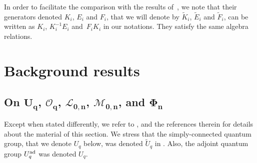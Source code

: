 \documentclass[10pt,a4paper]{amsart}
\numberwithin{equation}{section}
\theoremstyle{definition}
\newcommand{\Ll}{{\mathcal L}}
\newcommand{\Mm}{{\mathcal M}}
\newcommand{\Oo}{{\mathcal O}}
\begin{document}
In order to facilitate the comparison with the results of~\cite{DC-L}, we note that their generators denoted $K_i$, $E_i$ and $F_i$, that we will denote by $\tilde{K}_i$, $\tilde{E}_i$ and $\tilde{F}_i$, can be written as $K_i$, $K_i^{-1}E_i$ and~$F_iK_i$ in our notations. They satisfy the same algebra relations.

\section{Background results}\label{PREL}

\subsection[On U\_q, O\_q, L\_{0,n}, M\_{0,n}, and Phi\_n]{On $\boldsymbol{U_q}$, $\boldsymbol{\Oo_q}$, $\boldsymbol{\Ll_{0,n}}$, $\boldsymbol{\Mm_{0,n}}$, and $\boldsymbol{\Phi_n}$}\label{ALGdef}
Except when stated differently, we refer to \cite[Sections 2--4 and 6]{BR}, and the references therein for details about the material of this section. We stress that the simply-connected quantum group, that we denote $U_q$ below, was denoted $\tilde U_q$ in \cite{BR}. Also, the adjoint quantum group $U_q^{\rm ad}$ was denoted $U_q$.
\end{document}
